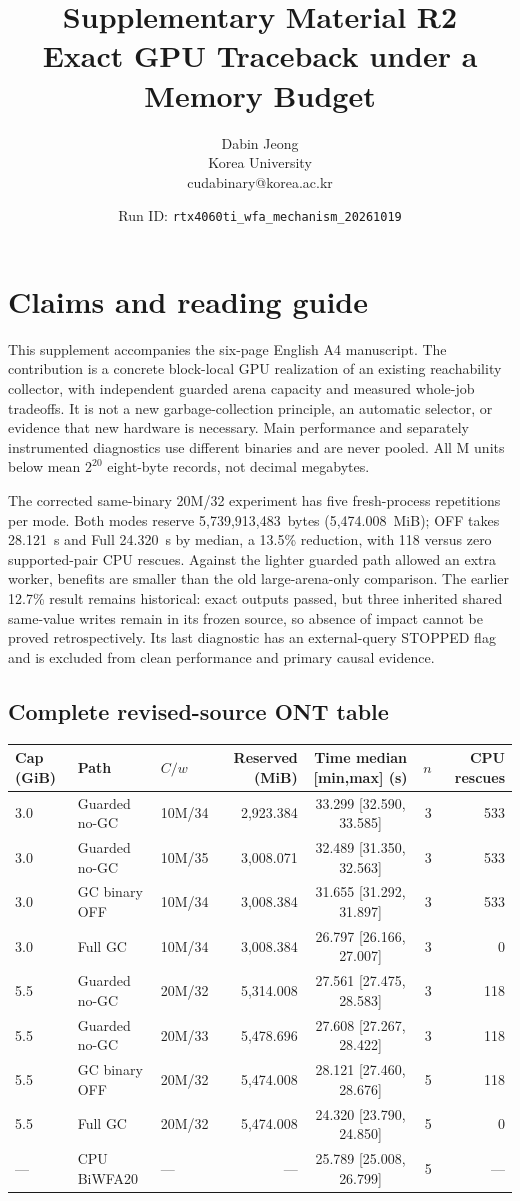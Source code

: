 \documentclass[11pt,a4paper]{article}
\title{Supplementary Material R2\\Exact GPU Traceback under a Memory Budget}
\author{Dabin Jeong\\Korea University\\cudabinary@korea.ac.kr}
\date{Run ID: \texttt{rtx4060ti\_wfa\_mechanism\_20261019}}
\begin{document}
\maketitle
\section{Claims and reading guide}
This supplement accompanies the six-page English A4 manuscript. The contribution is a concrete block-local GPU realization of an existing reachability collector, with independent guarded arena capacity and measured whole-job tradeoffs. It is not a new garbage-collection principle, an automatic selector, or evidence that new hardware is necessary. Main performance and separately instrumented diagnostics use different binaries and are never pooled. All M units below mean $2^{20}$ eight-byte records, not decimal megabytes.

The corrected same-binary 20M/32 experiment has five fresh-process repetitions per mode. Both modes reserve 5,739,913,483~bytes (5,474.008~MiB); OFF takes 28.121~s and Full 24.320~s by median, a 13.5\% reduction, with 118 versus zero supported-pair CPU rescues. Against the lighter guarded path allowed an extra worker, benefits are smaller than the old large-arena-only comparison. The earlier 12.7\% result remains historical: exact outputs passed, but three inherited shared same-value writes remain in its frozen source, so absence of impact cannot be proved retrospectively. Its last diagnostic has an external-query STOPPED flag and is excluded from clean performance and primary causal evidence.

\subsection{Complete revised-source ONT table}
\begin{center}\small\setlength{\tabcolsep}{4.8pt}\begin{tabular}{lllrcrr}
\toprule
Cap (GiB) & Path & $C/w$ & Reserved (MiB) & Time median [min,max] (s) & $n$ & CPU rescues\\
\midrule
3.0 & Guarded no-GC & 10M/34 & 2,923.384 & 33.299 [32.590, 33.585] & 3 & 533\\
3.0 & Guarded no-GC & 10M/35 & 3,008.071 & 32.489 [31.350, 32.563] & 3 & 533\\
3.0 & GC binary OFF & 10M/34 & 3,008.384 & 31.655 [31.292, 31.897] & 3 & 533\\
3.0 & Full GC & 10M/34 & 3,008.384 & 26.797 [26.166, 27.007] & 3 & 0\\
5.5 & Guarded no-GC & 20M/32 & 5,314.008 & 27.561 [27.475, 28.583] & 3 & 118\\
5.5 & Guarded no-GC & 20M/33 & 5,478.696 & 27.608 [27.267, 28.422] & 3 & 118\\
5.5 & GC binary OFF & 20M/32 & 5,474.008 & 28.121 [27.460, 28.676] & 5 & 118\\
5.5 & Full GC & 20M/32 & 5,474.008 & 24.320 [23.790, 24.850] & 5 & 0\\
\midrule
--- & CPU BiWFA20 & --- & --- & 25.789 [25.008, 26.799] & 5 & ---\\
\bottomrule
\end{tabular}
\end{center}
\end{document}
